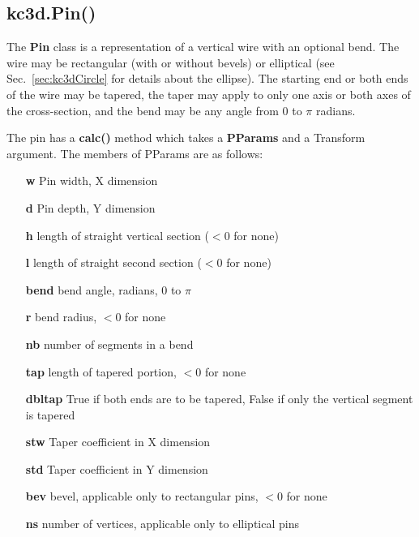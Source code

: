 \subsection{kc3d.Pin()}
The \textbf{Pin} class is a representation of a vertical wire with an optional bend. The wire
may be rectangular (with or without bevels) or elliptical (see Sec.~\ref{sec:kc3dCircle} for
details about the ellipse). The starting end or both ends of the wire may be tapered, the taper
may apply to only one axis or both axes of the cross-section, and the bend may be any angle
from 0 to $\pi$ radians. 

The pin has a \textbf{calc()} method which takes a \textbf{PParams} and a Transform
argument. The members of PParams are as follows:

\begin{itemize}
\item[\textbf{w}] Pin width, X dimension\\
\item[\textbf{d}] Pin depth, Y dimension\\
\item[\textbf{h}] length of straight vertical section ($<0$ for none)\\
\item[\textbf{l}] length of straight second section ($<0$ for none)\\
\item[\textbf{bend}] bend angle, radians, $0$ to $\pi$\\
\item[\textbf{r}] bend radius, $<0$ for none\\
\item[\textbf{nb}] number of segments in a bend\\
\item[\textbf{tap}] length of tapered portion, $<0$ for none\\
\item[\textbf{dbltap}] True if both ends are to be tapered, False if only the vertical segment is tapered\\
\item[\textbf{stw}] Taper coefficient in X dimension\\
\item[\textbf{std}] Taper coefficient in Y dimension\\
\item[\textbf{bev}] bevel, applicable only to rectangular pins, $<0$ for none\\
\item[\textbf{ns}] number of vertices, applicable only to elliptical pins\\
\end{itemize}

